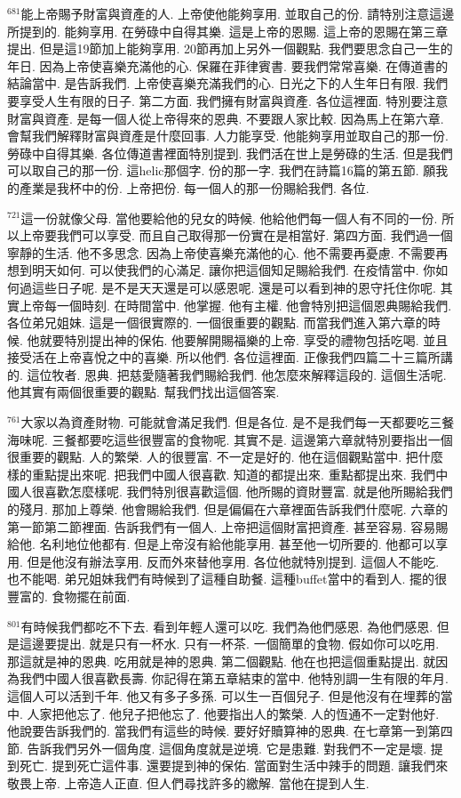 \documentclass{book}
\begin{document}
$^{681}$能上帝賜予財富與資產的人.
上帝使他能夠享用.
並取自己的份.
請特別注意這邊所提到的.
能夠享用.
在勞碌中自得其樂.
這是上帝的恩賜.
這上帝的恩賜在第三章提出.
但是這19節加上能夠享用.
20節再加上另外一個觀點.
我們要思念自己一生的年日.
因為上帝使喜樂充滿他的心.
保羅在菲律賓書.
要我們常常喜樂.
在傳道書的結論當中.
是告訴我們.
上帝使喜樂充滿我們的心.
日光之下的人生年日有限.
我們要享受人生有限的日子.
第二方面.
我們擁有財富與資產.
各位這裡面.
特別要注意財富與資產.
是每一個人從上帝得來的恩典.
不要跟人家比較.
因為馬上在第六章.
會幫我們解釋財富與資產是什麼回事.
人力能享受.
他能夠享用並取自己的那一份.
勞碌中自得其樂.
各位傳道書裡面特別提到.
我們活在世上是勞碌的生活.
但是我們可以取自己的那一份.
這helic那個字.
份的那一字.
我們在詩篇16篇的第五節.
願我的產業是我杯中的份.
上帝把份.
每一個人的那一份賜給我們.
各位.

$^{721}$這一份就像父母.
當他要給他的兒女的時候.
他給他們每一個人有不同的一份.
所以上帝要我們可以享受.
而且自己取得那一份實在是相當好.
第四方面.
我們過一個寧靜的生活.
他不多思念.
因為上帝使喜樂充滿他的心.
他不需要再憂慮.
不需要再想到明天如何.
可以使我們的心滿足.
讓你把這個知足賜給我們.
在疫情當中.
你如何過這些日子呢.
是不是天天還是可以感恩呢.
還是可以看到神的恩守托住你呢.
其實上帝每一個時刻.
在時間當中.
他掌握.
他有主權.
他會特別把這個恩典賜給我們.
各位弟兄姐妹.
這是一個很實際的.
一個很重要的觀點.
而當我們進入第六章的時候.
他就要特別提出神的保佑.
他要解開賜福樂的上帝.
享受的禮物包括吃喝.
並且接受活在上帝喜悅之中的喜樂.
所以他們.
各位這裡面.
正像我們四篇二十三篇所講的.
這位牧者.
恩典.
把慈愛隨著我們賜給我們.
他怎麼來解釋這段的.
這個生活呢.
他其實有兩個很重要的觀點.
幫我們找出這個答案.

$^{761}$大家以為資產財物.
可能就會滿足我們.
但是各位.
是不是我們每一天都要吃三餐海味呢.
三餐都要吃這些很豐富的食物呢.
其實不是.
這邊第六章就特別要指出一個很重要的觀點.
人的繁榮.
人的很豐富.
不一定是好的.
他在這個觀點當中.
把什麼樣的重點提出來呢.
把我們中國人很喜歡.
知道的都提出來.
重點都提出來.
我們中國人很喜歡怎麼樣呢.
我們特別很喜歡這個.
他所賜的資財豐富.
就是他所賜給我們的殘月.
那加上尊榮.
他會賜給我們.
但是偏偏在六章裡面告訴我們什麼呢.
六章的第一節第二節裡面.
告訴我們有一個人.
上帝把這個財富把資產.
甚至容易.
容易賜給他.
名利地位他都有.
但是上帝沒有給他能享用.
甚至他一切所要的.
他都可以享用.
但是他沒有辦法享用.
反而外來替他享用.
各位他就特別提到.
這個人不能吃.
也不能喝.
弟兄姐妹我們有時候到了這種自助餐.
這種buffet當中的看到人.
擺的很豐富的.
食物擺在前面.

$^{801}$有時候我們都吃不下去.
看到年輕人還可以吃.
我們為他們感恩.
為他們感恩.
但是這邊要提出.
就是只有一杯水.
只有一杯茶.
一個簡單的食物.
假如你可以吃用.
那這就是神的恩典.
吃用就是神的恩典.
第二個觀點.
他在也把這個重點提出.
就因為我們中國人很喜歡長壽.
你記得在第五章結束的當中.
他特別調一生有限的年月.
這個人可以活到千年.
他又有多子多孫.
可以生一百個兒子.
但是他沒有在埋葬的當中.
人家把他忘了.
他兒子把他忘了.
他要指出人的繁榮.
人的恆通不一定對他好.
他說要告訴我們的.
當我們有這些的時候.
要好好贖算神的恩典.
在七章第一到第四節.
告訴我們另外一個角度.
這個角度就是逆境.
它是患難.
對我們不一定是壞.
提到死亡.
提到死亡這件事.
還要提到神的保佑.
當面對生活中辣手的問題.
讓我們來敬畏上帝.
上帝造人正直.
但人們尋找許多的繳解.
當他在提到人生.
\end{document}
